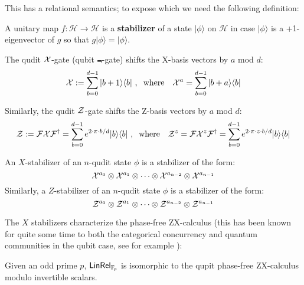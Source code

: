 This has a relational semantics; to expose which we need the following definition:
\begin{definition}
A unitary map $f:\mathcal{H}\to \mathcal{H}$ is a {\bf stabilizer} of a state $|\phi\rangle$ on $\mathcal H$ in case $|\phi\rangle$ is a +1-eigenvector of $g$ so that $g| \phi\rangle = |\phi \rangle$.


The qudit ${\cal X}$-gate (qubit $\Not$-gate)  shifts the X-basis vectors by $a$ mod $d$:
$$
{\cal X} := \sum_{b=0}^{d-1} | b+1\rangle \langle b|
\ , \hspace*{.2cm} \text{where \ \ }
{\cal X}^a = \sum_{b=0}^{d-1} | b+a\rangle \langle b|
$$

Similarly, the  qudit ${\cal Z}$-gate  shifts the Z-basis vectors by $a$ mod $d$:
$$
{\cal Z}
:=
{\cal F}
{\cal X}
{\cal F}^\dag
=
\sum_{b=0}^{d-1}
e^{2\cdot\pi \cdot b/d} | b\rangle \langle b|
\ , \hspace*{.2cm} \text{where \ \ }
{\cal Z}^z
=
{\cal F}
{\cal X}^z
{\cal F}^\dag
=
\sum_{b=0}^{d-1}
e^{2\cdot\pi \cdot z\cdot b/d} | b\rangle \langle b|
$$


An $X$-stabilizer of an $n$-qudit state $\phi$ is a stabilizer of the form:
$$
{\cal X}^{a_0}
\otimes  {\cal X}^{a_1}
\otimes 
\cdots 
\otimes {\cal X}^{a_{n-2}}
\otimes {\cal X}^{a_{n-1}}
$$
Similarly, a $Z$-stabilizer of an $n$-qudit state $\phi$ is a stabilizer of the form:
$$
{\cal Z}^{a_0}
\otimes  {\cal Z}^{a_1} 
\otimes 
\cdots
\otimes {\cal Z}^{a_{n-2}}
\otimes {\cal Z}^{a_{n-1}}
$$
\end{definition}
The $X$ stabilizers characterize the phase-free ZX-calculus (this has been known for quite some time to both the categorical concurrency and quantum communities in the qubit case, see for example \cite[Page 8]{ih}):
\begin{lemma}
Given an odd prime $p$, $\sf LinRel_{\mathbb{F}_p}$ is isomorphic to the qupit phase-free ZX-calculus modulo invertible scalars.
\end{lemma}
